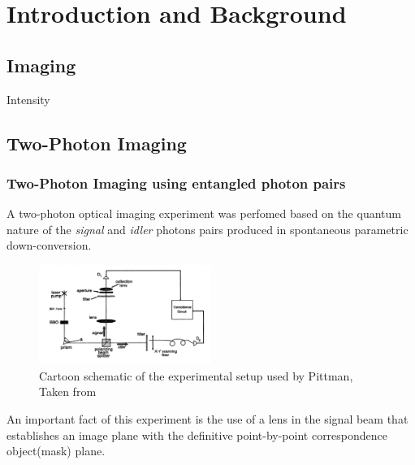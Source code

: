 
\chapter{Introduction and Background} %

\label{Chapter1} %


\section{Imaging}
Intensity \cite{physicsGhost}

\section{Two-Photon Imaging}

\subsection{Two-Photon Imaging using entangled photon pairs}
A two-photon optical imaging experiment was perfomed based on the quantum nature of the \textit{signal} and \textit{idler}
photons pairs produced in spontaneous parametric down-conversion\cite{pittman}.
\begin{figure}[h]
\centering
\includegraphics[width=0.5\textwidth]{Figures/pittman.png}
\caption{Cartoon schematic of the experimental setup used by Pittman, Taken from \cite{pittman}} 
\label{fig:pittman}
\end{figure}
An important fact of this experiment is the use of a lens in the signal beam that establishes an image plane with the definitive point-by-point correspondence object(mask) plane.




